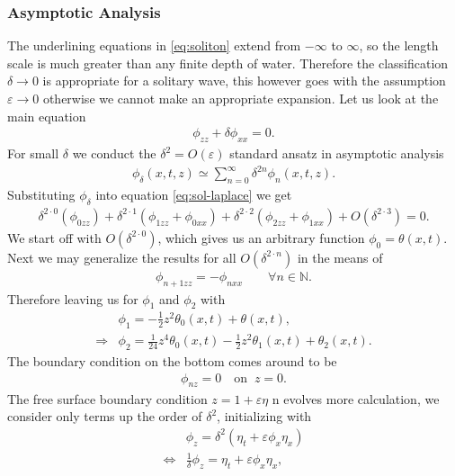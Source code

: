 \subsubsection{Asymptotic Analysis}
The underlining equations in \ref{eq:soliton} extend from $-\infty$ to
$\infty$, so the length scale is much greater than any finite depth of
water. Therefore the classification $\delta \rightarrow 0$ is appropriate for
a solitary wave, this however goes with the assumption
$\varepsilon\rightarrow 0$ otherwise we cannot make an appropriate expansion.
Let us look at the main equation
\begin{align}\label{eq:sol-laplace}
    \phi_{zz} + \delta \phi_{x x} = 0.
\end{align}
For small $\delta$ we conduct the $\delta^2 = O(\varepsilon)$ standard ansatz
in asymptotic analysis
\begin{align}
    \phi_{\delta}(x, t, z) \simeq \sum_{n=0}^{\infty} \delta^{2n}\phi_n(x, t,
    z).
\end{align}
Substituting $\phi_\delta$ into equation \ref{eq:sol-laplace} we get
\begin{align}
    \delta^{2\cdot 0}\left( \phi_{0zz} \right)  + \delta^{2\cdot 1}\left(
    \phi_{1zz}+\phi_{0 x x} \right)  + \delta^{2\cdot 2}\left( \phi_{2zz}+
    \phi_{1 x x} \right)  + O(\delta^{2\cdot 3}) = 0.
\end{align}
We start off with $O(\delta^{2\cdot0}) $, which gives us an arbitrary function
$\phi_{0} = \theta(x, t)$. Next we may generalize the results for all
$O(\delta^{2\cdot n})$ in the means of
\begin{align}
    \phi_{n+1zz}  = -\phi_{nx x}\qquad \forall n\in \mathbb{N} .
\end{align}
Therefore leaving us for $\phi_1$ and $\phi_2$ with
\begin{align}
    &\phi_1 = -\frac{1}{2} z^2 \theta_0(x,t) + \theta(x, t),\\
    \Rightarrow& \phi_2 =
    \frac{1}{24}z^4\theta_0(x,t)-\frac{1}{2}z^2\theta_1(x,t) + \theta_2(x,t).
\end{align}
The boundary condition on the bottom comes around to be
\begin{align}
    \phi_{nz} =0 \quad \text{on}\;\; z=0.
\end{align}
The free surface boundary condition $z= 1+\varepsilon\eta$ n evolves more calculation, we consider
only terms up the order of $\delta^2$, initializing with
\begin{align}
    &\phi_z = \delta^2(\eta_t + \varepsilon\phi_x \eta_x)\\
    \Leftrightarrow &\frac{1}{\delta}\phi_z = \eta_t + \varepsilon\phi_x
    \eta_x,
\end{align}
